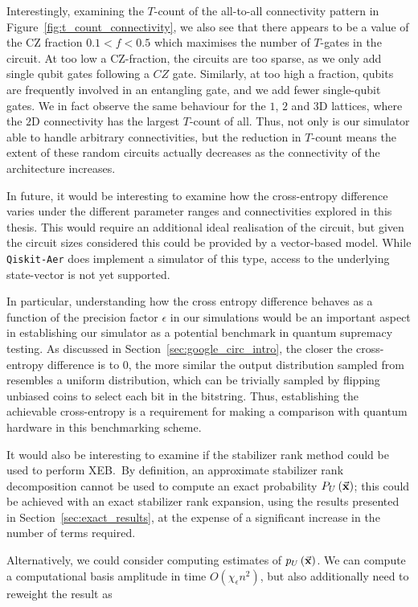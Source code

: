 Interestingly, examining the $T$-count of the all-to-all connectivity pattern in Figure~\ref{fig:t_count_connectivity}, we also see that there appears to be a value of the CZ fraction $0.1<f<0.5$ which maximises the number of $T$-gates in the circuit. At too low a CZ-fraction, the circuits are too sparse, as we only add single qubit gates following a $CZ$ gate. Similarly, at too high a fraction, qubits are frequently involved in an entangling gate, and we add fewer single-qubit gates. We in fact observe the same behaviour for the $1$, $2$ and $3$D lattices, where the $2$D connectivity has the largest $T$-count of all. Thus, not only is our simulator able to handle arbitrary connectivities, but the reduction in $T$-count means the extent of these random circuits actually decreases as the connectivity of the architecture increases.\par
In future, it would be interesting to examine how the cross-entropy difference varies under the different parameter ranges and connectivities explored in this thesis. This would require an additional ideal realisation of the circuit, but given the circuit sizes considered this could be provided by a vector-based model. While \texttt{Qiskit-Aer} does implement a simulator of this type, access to the underlying state-vector is not yet supported.\par
In particular, understanding how the cross entropy difference behaves as a function of the precision factor $\epsilon$ in our simulations would be an important aspect in establishing our simulator as a potential benchmark in quantum supremacy testing. As discussed in Section~\ref{sec:google_circ_intro}, the closer the cross-entropy difference is to $0$, the more similar the output distribution sampled from resembles a uniform distribution, which can be trivially sampled by flipping unbiased coins to select each bit in the bitstring. Thus, establishing the achievable cross-entropy is a requirement for making a comparison with quantum hardware in this benchmarking scheme.\par 
It would also be interesting to examine if the stabilizer rank method could be used to perform XEB.\ By definition, an approximate stabilizer rank decomposition cannot be used to compute an exact probability $P_{U}\left(\va{x}\right)$; this could be achieved with an exact stabilizer rank expansion, using the results presented in Section~\ref{sec:exact_results}, at the expense of a significant increase in the number of terms required.\par
Alternatively, we could consider computing estimates of $p_{U}\left(\va{x}\right)$. We can compute a computational basis amplitude in time $O\left(\chi_{\epsilon} n^{2}\right)$, but also additionally need to reweight the result as
